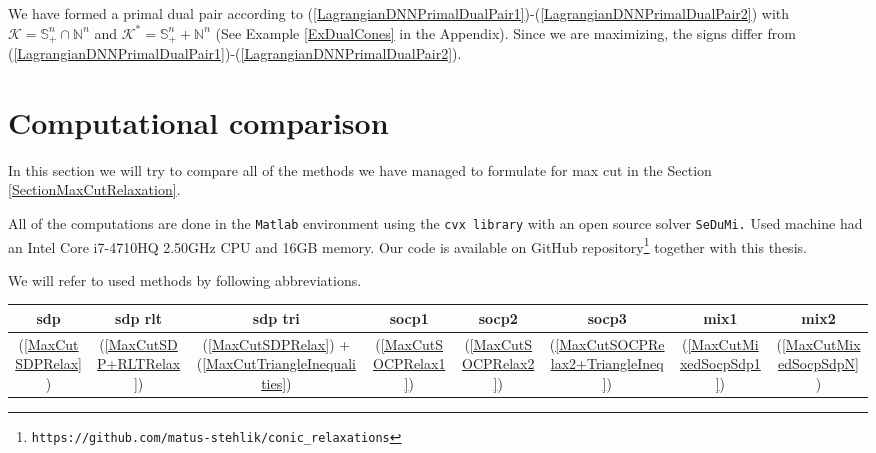 \documentclass[12pt]{book}
\theoremstyle{definition}
\begin{document}
\rem We have formed a primal dual pair according to (\ref{LagrangianDNNPrimalDualPair1})-(\ref{LagrangianDNNPrimalDualPair2}) with $\mathcal{K}= \mathbb{S}^n_+ \cap \mathbb{N}^n $ and $\mathcal{K}^*= \mathbb{S}^n_+ + \mathbb{N}^n $ (See Example \ref{ExDualCones} in the Appendix).
Since we are maximizing, the signs differ from (\ref{LagrangianDNNPrimalDualPair1})-(\ref{LagrangianDNNPrimalDualPair2}).












%
%
%
%





\chapter{Computational comparison}

In this section we will try to compare all of the methods we have managed to formulate for max cut in the Section \ref{SectionMaxCutRelaxation}.

All of the computations are done in the {\tt Matlab} environment using the {\tt cvx library} with an open source solver {\tt SeDuMi.} Used machine had an {Intel Core i7-4710HQ 2.50GHz CPU} and 16GB memory.
Our code is available on GitHub repository\footnote{{\tt https://github.com/matus-stehlik/conic\_relaxations}} together with this thesis.  

We will refer to used methods by following abbreviations.
\bigskip

\begin{tabular}{|c|c|c|c|c|c|c|c|}
\hline
sdp & 
sdp rlt &	
sdp tri &	
socp1 & 
socp2 &
socp3 &	
mix1 & 
mix2 
\\ \hline
(\ref{MaxCutSDPRelax}) & 
(\ref{MaxCutSDP+RLTRelax}) & 
(\ref{MaxCutSDPRelax}) + (\ref{MaxCutTriangleInequalities}) & (\ref{MaxCutSOCPRelax1}) & 
(\ref{MaxCutSOCPRelax2}) & 
(\ref{MaxCutSOCPRelax2+TriangleIneq}) &
(\ref{MaxCutMixedSocpSdp1}) &
(\ref{MaxCutMixedSocpSdpN}) \\
\hline
\end{tabular}
\end{document}
